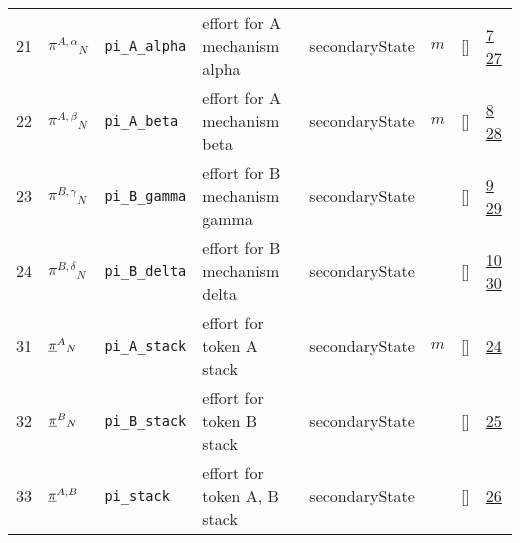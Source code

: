 \begin{longtable}{|p{1cm}|p{3cm}|p{3cm}|p{7cm}|p{3.0cm}|p{3cm}|p{2cm}|p{1cm}|}
    21
             & \hypertarget{"v:21"}{ $ {{\pi^{A,\alpha}}}{_{N}} $}
             & \verb|pi_A_alpha|
             & effort for A mechanism alpha
             & \begin{lay}secondaryState \end{lay}
             & $ m  $
             & []
             & \hyperlink{"e:7"}{ 7 }
                 \hyperlink{"e:27"}{ 27 }
                 \\
    22
             & \hypertarget{"v:22"}{ $ {{\pi^{A,\beta}}}{_{N}} $}
             & \verb|pi_A_beta|
             & effort for A mechanism beta
             & \begin{lay}secondaryState \end{lay}
             & $ m  $
             & []
             & \hyperlink{"e:8"}{ 8 }
                 \hyperlink{"e:28"}{ 28 }
                 \\
    23
             & \hypertarget{"v:23"}{ $ {{\pi^{B,\gamma}}}{_{N}} $}
             & \verb|pi_B_gamma|
             & effort for B mechanism gamma
             & \begin{lay}secondaryState \end{lay}
             & $  $
             & []
             & \hyperlink{"e:9"}{ 9 }
                 \hyperlink{"e:29"}{ 29 }
                 \\
    24
             & \hypertarget{"v:24"}{ $ {{\pi^{B,\delta}}}{_{N}} $}
             & \verb|pi_B_delta|
             & effort for B mechanism delta
             & \begin{lay}secondaryState \end{lay}
             & $  $
             & []
             & \hyperlink{"e:10"}{ 10 }
                 \hyperlink{"e:30"}{ 30 }
                 \\
    31
             & \hypertarget{"v:31"}{ $ {{{{\protect\underline{\bf{\pi}}}}^A}}{_{N}} $}
             & \verb|pi_A_stack|
             & effort for token A stack
             & \begin{lay}secondaryState \end{lay}
             & $ m  $
             & []
             & \hyperlink{"e:24"}{ 24 }
                 \\
    32
             & \hypertarget{"v:32"}{ $ {{{{\protect\underline{\bf{\pi}}}}^B}}{_{N}} $}
             & \verb|pi_B_stack|
             & effort for token B stack
             & \begin{lay}secondaryState \end{lay}
             & $  $
             & []
             & \hyperlink{"e:25"}{ 25 }
                 \\
    33
             & \hypertarget{"v:33"}{ $ {{{{\protect\underline{\bf{\pi}}}}^{A,B}}}{_{}} $}
             & \verb|pi_stack|
             & effort for token A, B stack
             & \begin{lay}secondaryState \end{lay}
             & $  $
             & []
             & \hyperlink{"e:26"}{ 26 }
                 \\
    \end{longtable}